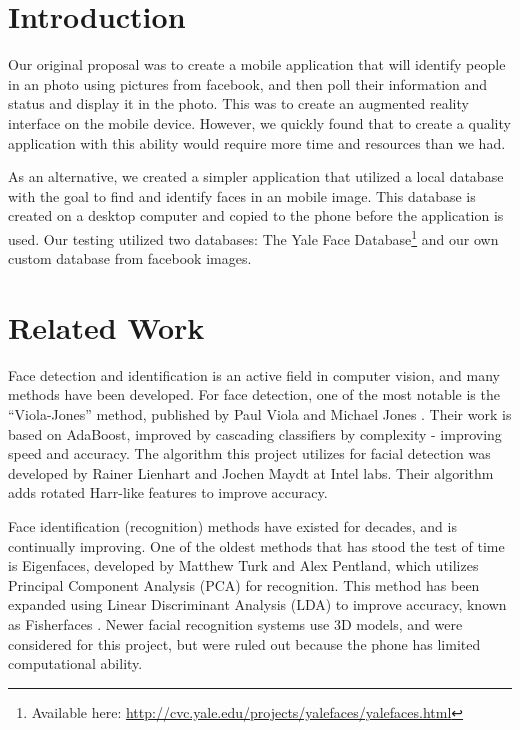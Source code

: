 \section{Introduction} %


Our original proposal was to create a mobile application that will
identify people in an photo using pictures from facebook, and then
poll their information and status and display it in the photo.  This
was to create an augmented reality interface on the mobile device.
However, we quickly found that to create a quality application with
this ability would require more time and resources than we had.

As an alternative, we created a simpler application that utilized a
local database with the goal to find and identify faces in an mobile
image.  This database is created on a desktop computer and copied to
the phone before the application is used.  Our testing utilized two
databases: The Yale Face Database\footnote{Available here:
  \url{http://cvc.yale.edu/projects/yalefaces/yalefaces.html}}
\cite{YaleFace} and our own custom database from facebook images.

\section{Related Work} %

Face detection and identification is an active field in computer
vision, and many methods have been developed.  For face detection, one
of the most notable is the ``Viola-Jones'' method, published by Paul
Viola and Michael Jones \cite{ViolaJones}.  Their work is based on
AdaBoost\cite{AdaBoost}, improved by cascading classifiers by
complexity - improving speed and accuracy.  The algorithm this project
utilizes for facial detection was developed by Rainer Lienhart and
Jochen Maydt at Intel labs.\cite{Lienhart} Their algorithm adds
rotated Harr-like features to improve accuracy.

Face identification (recognition) methods have existed for decades,
and is continually improving.  One of the oldest methods that has
stood the test of time is Eigenfaces\cite{Eigenfaces}, developed by
Matthew Turk and Alex Pentland, which utilizes Principal Component
Analysis (PCA) for recognition.  This method has been expanded using
Linear Discriminant Analysis (LDA) to improve accuracy, known as
Fisherfaces \cite{Fisherfaces}.  Newer facial recognition systems use
3D models\cite{3d}, and were considered for this project, but were
ruled out because the phone has limited computational ability.



